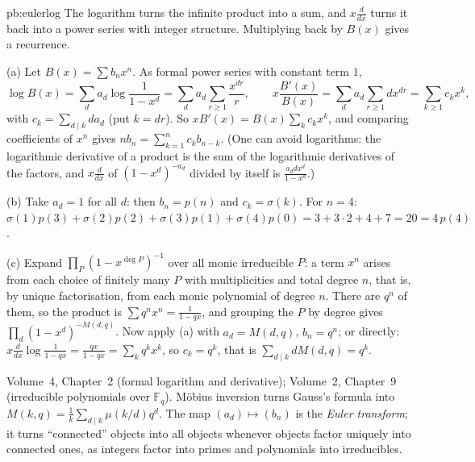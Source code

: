 \begin{solution}{pb:eulerlog}
\idea The logarithm turns the infinite product into a sum, and $x\frac d{dx}$ turns it back into a power series with integer
structure. Multiplying back by $B(x)$ gives a recurrence.

\writeup (a) Let $B(x)=\sum b_nx^n$. As formal power series with constant term $1$,
\[
\log B(x)=\sum_da_d\log\frac1{1-x^d}=\sum_da_d\sum_{r\ge1}\frac{x^{dr}}r,\qquad x\frac{B'(x)}{B(x)}=\sum_da_d\sum_{r\ge1}dx^{dr}=\sum_{k\ge1}c_kx^k,
\]
with $c_k=\sum_{d\mid k}da_d$ (put $k=dr$). So $xB'(x)=B(x)\sum_kc_kx^k$, and comparing coefficients of $x^n$ gives
$nb_n=\sum_{k=1}^nc_kb_{n-k}$. (One can avoid logarithms: the logarithmic derivative of a product is the sum of the logarithmic
derivatives of the factors, and $x\frac d{dx}$ of $(1-x^d)^{-a_d}$ divided by itself is $\frac{a_ddx^d}{1-x^d}$.)

(b) Take $a_d=1$ for all $d$: then $b_n=p(n)$ and $c_k=\sigma(k)$. For $n=4$: $\sigma(1)p(3)+\sigma(2)p(2)+\sigma(3)p(1)+\sigma(4)p(0)
=3+3\cdot2+4+7=20=4\,p(4)$.

(c) Expand $\prod_P(1-x^{\deg P})^{-1}$ over all monic irreducible $P$: a term $x^n$ arises from each choice of finitely many $P$ with
multiplicities and total degree $n$, that is, by unique factorisation, from each monic polynomial of degree $n$. There are $q^n$ of
them, so the product is $\sum q^nx^n=\frac1{1-qx}$, and grouping the $P$ by degree gives $\prod_d(1-x^d)^{-M(d,q)}$. Now apply
(a) with $a_d=M(d,q)$, $b_n=q^n$; or directly: $x\frac{d}{dx}\log\frac1{1-qx}=\frac{qx}{1-qx}=\sum_kq^kx^k$, so $c_k=q^k$, that is
$\sum_{d\mid k}dM(d,q)=q^k$.

\tools Volume~4, Chapter~2 (formal logarithm and derivative); Volume~2, Chapter~9 (irreducible polynomials over $\mathbb F_q$).
\leads Möbius inversion turns Gauss's formula into $M(k,q)=\frac1k\sum_{d\mid k}\mu(k/d)q^d$. The map $(a_d)\mapsto(b_n)$ is the
\emph{Euler transform}; it turns ``connected'' objects into all objects whenever objects factor uniquely into connected ones,
as integers factor into primes and polynomials into irreducibles.
\end{solution}

